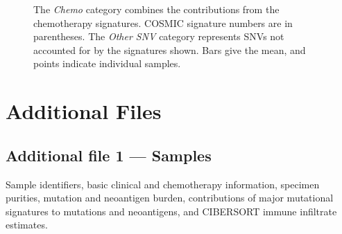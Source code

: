 \documentclass{bmcart}
\begin{document}
\begin{backmatter}
\begin{figure}[h!]
  \caption{
      The \textit{Chemo} category combines the contributions from the chemotherapy signatures. COSMIC signature numbers are in parentheses. The \textit{Other SNV} category represents SNVs not accounted for by the signatures shown. Bars give the mean, and points indicate individual samples.}
      \end{figure}




\section*{Additional Files}
  \subsection*{Additional file 1 --- Samples}
    Sample identifiers, basic clinical and chemotherapy information, specimen purities, mutation and neoantigen burden, contributions of major mutational signatures to mutations and neoantigens, and CIBERSORT immune infiltrate estimates.


\end{backmatter}
\end{document}
